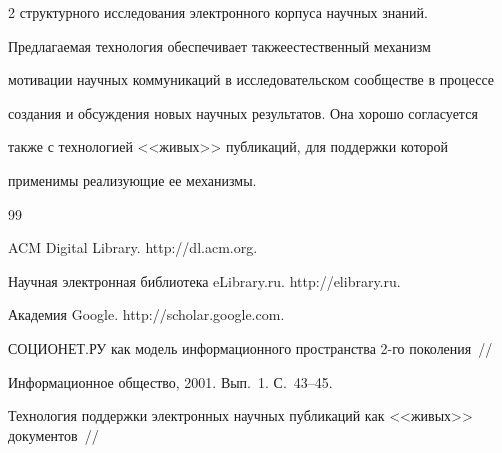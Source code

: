 \begin{multicols}{2}
структурного исследования электронного корпуса научных знаний. 


  


  Предлагаемая технология обеспечивает также\linebreak естественный механизм 


мотивации научных коммуникаций в исследовательском сообществе в процессе 


создания и обсуждения новых научных результа\-тов. Она хорошо согласуется 


также с технологией <<живых>> публикаций, для поддержки которой 


применимы реализующие ее механизмы. 





{\small\frenchspacing


{%




\begin{thebibliography}{99}


  




ACM Digital Library. {\sf http://dl.acm.org}.







Научная электронная библиотека eLibrary.ru. {\sf http://elibrary.ru}.







Академия Google. {\sf http://scholar.google.com}.









СОЦИОНЕТ.РУ как модель информационного пространства 2-го поколения~// 


Информационное общество, 2001. Вып.~1. С.~43--45. 









Технология поддержки электронных научных публикаций как <<живых>> документов~// 



\end{thebibliography}}}
\end{multicols}
